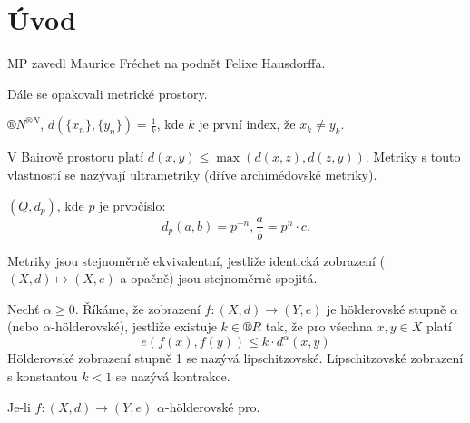 \documentclass[12pt]{article}					%
\begin{document}
\section*{Úvod}
\begin{poznamka}[Historie]
	MP zavedl Maurice Fréchet na podnět Felixe Hausdorffa.
\end{poznamka}

\begin{poznamka}
	Dále se opakovali metrické prostory.
\end{poznamka}

\begin{definice}
	$®N^{®N}$, $d(\{x_n\}, \{y_n\}) = \frac{1}{k}$, kde $k$ je první index, že $x_k ≠ y_k$.
\end{definice}

\begin{poznamka}
	V Bairově prostoru platí $d(x, y) ≤ \max(d(x, z), d(z, y))$. Metriky s touto vlastností se nazývají ultrametriky (dříve archimédovské metriky).
\end{poznamka}

\begin{definice}
	$(Q, d_p)$, kde $p$ je prvočíslo:
	$$ d_p(a, b) = p^{-n}, \frac{a}{b} = p^n · c. $$
\end{definice}

\begin{definice}
	Metriky jsou stejnoměrně ekvivalentní, jestliže identická zobrazení ($(X, d) \mapsto (X, e)$ a opačně) jsou stejnoměrně spojitá.
\end{definice}

\begin{definice}
	Nechť $\alpha ≥ 0$. Říkáme, že zobrazení $f: (X, d) \rightarrow (Y, e)$ je hölderovské stupně $\alpha$ (nebo $\alpha$-hölderovské), jestliže existuje $k \in ®R$ tak, že pro všechna $x, y \in X$ platí
	$$ e(f(x), f(y)) ≤ k·d^\alpha(x, y) $$
	Hölderovské zobrazení stupně 1 se nazývá lipschitzovské. Lipschitzovské zobrazení s konstantou $k < 1$ se nazývá kontrakce.
\end{definice}



\begin{tvrzeni}
	Je-li $f: (X, d) \rightarrow (Y, e)$ $\alpha$-hölderovské pro.
\end{tvrzeni}
\end{document}

